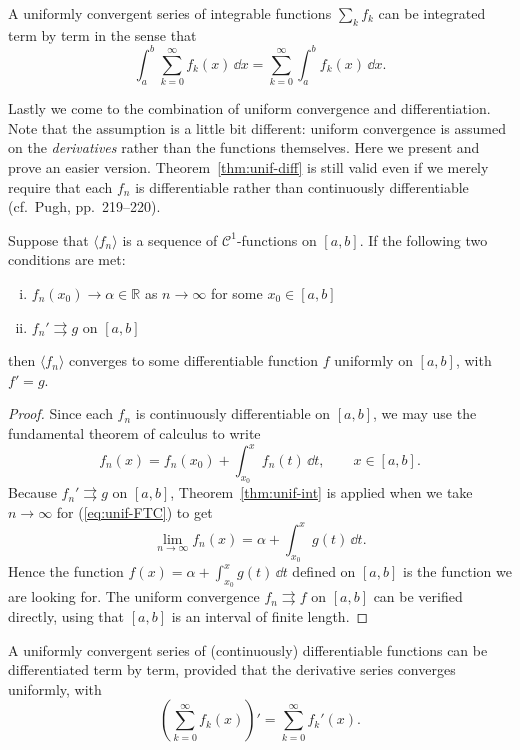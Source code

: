 \documentclass[11pt]{article}
\begin{document}
\begin{cor}
  A uniformly convergent series of integrable functions $\sum_k f_k$ can be integrated term by term in the sense that
  \[
    \int_a^b \sum_{k=0}^\infty f_k(x) \, \dd x = \sum_{k=0}^\infty \int_a^b f_k(x) \, \dd x.
  \]
\end{cor}

Lastly we come to the combination of uniform convergence and differentiation.
Note that the assumption is a little bit different: uniform convergence is assumed on the \textit{derivatives} rather than the functions themselves.
Here we present and prove an easier version.
Theorem~\ref{thm:unif-diff} is still valid even if we merely require that each $f_n$ is differentiable rather than continuously differentiable (cf.~Pugh, pp.\ 219--220).

\begin{thm}
  \label{thm:unif-diff}
  Suppose that $\langle f_n \rangle$ is a sequence of $\mathcal{C}^1$-functions on $[a,b]$.
  If the following two conditions are met:
  \begin{enumerate}[(i)]
    \item $f_n(x_0) \to \alpha \in \mathbb{R}$ as $n \to \infty$ for some $x_0 \in [a,b]$
    \item $f_n' \rightrightarrows g$ on $[a,b]$
  \end{enumerate}
  then $\langle f_n \rangle$ converges to some differentiable function $f$ uniformly on $[a,b]$, with $f' = g$.
\end{thm}

\begin{proof}
  Since each $f_n$ is continuously differentiable on $[a,b]$, we may use the fundamental theorem of calculus to write
  \begin{equation}
    \label{eq:unif-FTC}
    f_n(x) = f_n(x_0) + \int_{x_0}^x f_n(t) \, \dd t, \qquad x \in [a,b].
  \end{equation}
  Because $f_n' \rightrightarrows g$ on $[a,b]$, Theorem~\ref{thm:unif-int} is applied when we take $n \to \infty$ for (\ref{eq:unif-FTC}) to get
  \[
    \lim_{n \to \infty} f_n(x) = \alpha + \int_{x_0}^x g(t) \, \dd t.
  \]
  Hence the function $\displaystyle f(x) = \alpha + \int_{x_0}^x g(t) \, \dd t$ defined on $[a,b]$ is the function we are looking for.
  The uniform convergence $f_n \rightrightarrows f$ on $[a,b]$ can be verified directly, using that $[a,b]$ is an interval of finite length.
\end{proof}

\begin{cor}
  A uniformly convergent series of (continuously) differentiable functions can be differentiated term by term, provided that the derivative series converges uniformly, with
  \[
    \left( \sum_{k=0}^\infty f_k(x) \right)' = \sum_{k=0}^\infty f_k'(x).
  \]
\end{cor}
\end{document}
